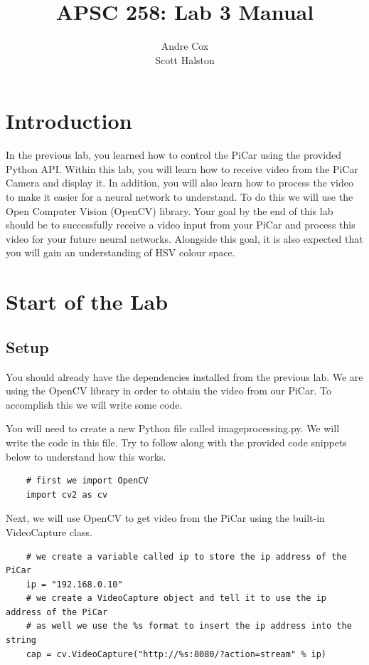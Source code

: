 \documentclass[11pt]{report}
\title{APSC 258: Lab 3 Manual}
\author{Andre Cox \\ Scott Halston}
\begin{document}
\maketitle
\tableofcontents

\clearpage

\chapter{Introduction}
In the previous lab, you learned how to control the PiCar using the provided Python API. Within this lab, you will learn how to receive video from the PiCar Camera and display it. In addition, you will also learn how to process the video to make it easier for a neural network to understand. To do this we will use the Open Computer Vision (OpenCV) library.
Your goal by the end of this lab should be to successfully receive a video input from your PiCar and process this video for your future neural networks. Alongside this goal, it is also expected that you will gain an understanding of HSV colour space.

\chapter{Start of the Lab}
\section{Setup}
You should already have the dependencies installed from the previous lab.
We are using the OpenCV library in order to obtain the video from our PiCar. To accomplish this we will write some code.

You will need to create a new Python file called imageprocessing.py. We will write the code in this file.
Try to follow along with the provided code snippets below to understand how this works. 

\begin{verbatim}
    # first we import OpenCV 
    import cv2 as cv 
\end{verbatim}

Next, we will use OpenCV to get video from the PiCar using the built-in VideoCapture class.
\begin{verbatim}
    # we create a variable called ip to store the ip address of the PiCar
    ip = "192.168.0.10"
    # we create a VideoCapture object and tell it to use the ip address of the PiCar
    # as well we use the %s format to insert the ip address into the string
    cap = cv.VideoCapture("http://%s:8080/?action=stream" % ip)
\end{verbatim}
\end{document}
